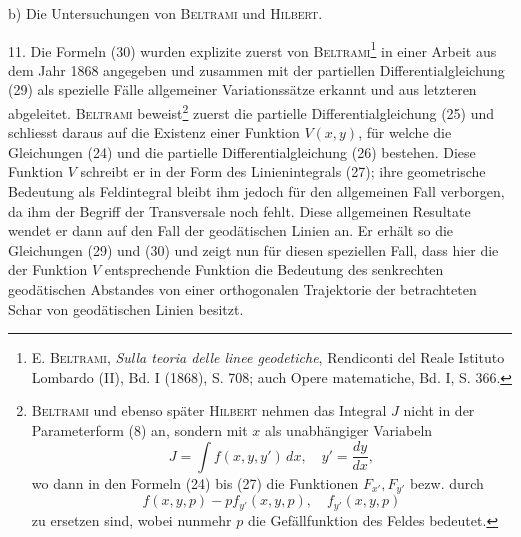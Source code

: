 \clearpage\begingroup\NoSourceHead{}
\renewcommand{\thefootnote}{\arabic{footnote})}\setcounter{footnote}{13}
\noindent\hspace*{\parindent}b) Die Untersuchungen von \textsc{Beltrami} und \textsc{Hilbert}.
\par\noindent\hspace*{\parindent}11. Die Formeln (30) wurden explizite zuerst von \textsc{Beltrami}\footnote{E. \textsc{Beltrami}, \textit{Sulla teoria delle linee geodetiche}, Rendiconti del Reale Istituto Lombardo (II),
Bd. I (1868), S. 708; auch Opere matematiche, Bd. I, S. 366.} in einer
Arbeit aus dem Jahr 1868 angegeben und zusammen mit der partiellen Differentialgleichung
(29) als spezielle Fälle allgemeiner Variationssätze erkannt
und aus letzteren abgeleitet. \textsc{Beltrami} beweist\footnote{\textsc{Beltrami} und ebenso später \textsc{Hilbert} nehmen das Integral $J$ nicht in der Parameterform (8)
an, sondern mit $x$ als unabhängiger Variabeln
\[
J=\int f(x,y,y')\,dx,\quad y'=\frac{dy}{dx},
\]
wo dann in den Formeln (24) bis (27) die Funktionen $F_{x'},F_{y'}$ bezw. durch
\[
f(x,y,p)-pf_{y'}(x,y,p),\quad f_{y'}(x,y,p)
\]
zu ersetzen sind, wobei nunmehr $p$ die Gefällfunktion des Feldes bedeutet.} zuerst die partielle Differentialgleichung
(25) und schliesst daraus auf die Existenz einer Funktion
$V(x,y)$, für welche die Gleichungen (24) und die partielle Differentialgleichung
(26) bestehen. Diese Funktion $V$ schreibt er in der Form des Linienintegrals
(27); ihre geometrische Bedeutung als Feldintegral bleibt ihm jedoch für den
allgemeinen Fall verborgen, da ihm der Begriff der Transversale noch fehlt.
Diese allgemeinen Resultate wendet er dann auf den Fall der geodätischen
Linien an. Er erhält so die Gleichungen (29) und (30) und zeigt nun für
diesen speziellen Fall, dass hier die der Funktion $V$ entsprechende Funktion
die Bedeutung des senkrechten geodätischen Abstandes von einer orthogonalen
Trajektorie der betrachteten Schar von geodätischen Linien besitzt.

